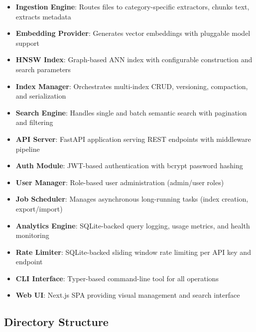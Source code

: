 \documentclass[11pt,a4paper]{article}
\begin{document}
\begin{itemize}
    \item \textbf{Ingestion Engine}: Routes files to category-specific extractors, chunks text, extracts metadata
    \item \textbf{Embedding Provider}: Generates vector embeddings with pluggable model support
    \item \textbf{HNSW Index}: Graph-based ANN index with configurable construction and search parameters
    \item \textbf{Index Manager}: Orchestrates multi-index CRUD, versioning, compaction, and serialization
    \item \textbf{Search Engine}: Handles single and batch semantic search with pagination and filtering
    \item \textbf{API Server}: FastAPI application serving REST endpoints with middleware pipeline
    \item \textbf{Auth Module}: JWT-based authentication with bcrypt password hashing
    \item \textbf{User Manager}: Role-based user administration (admin/user roles)
    \item \textbf{Job Scheduler}: Manages asynchronous long-running tasks (index creation, export/import)
    \item \textbf{Analytics Engine}: SQLite-backed query logging, usage metrics, and health monitoring
    \item \textbf{Rate Limiter}: SQLite-backed sliding window rate limiting per API key and endpoint
    \item \textbf{CLI Interface}: Typer-based command-line tool for all operations
    \item \textbf{Web UI}: Next.js SPA providing visual management and search interface
\end{itemize}

\subsection{Directory Structure}
\end{document}
